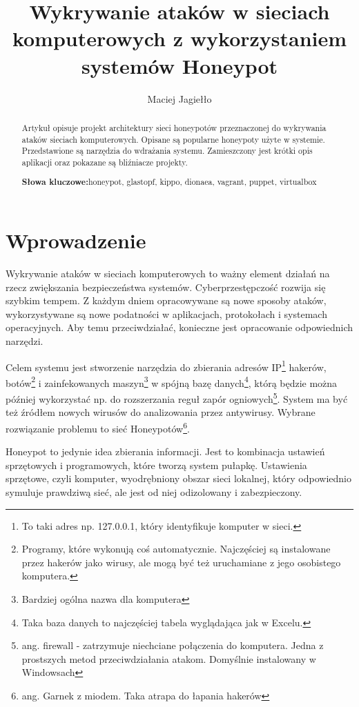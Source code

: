 \documentclass[runningheads,a4paper]{llncs}
\newcommand{\keywords}[1]{\par\addvspace\baselineskip
\noindent\keywordname\enspace\ignorespaces#1}
\renewcommand{\keywordname}{\textbf{Słowa kluczowe:}}
\begin{document}
\mainmatter
\title{Wykrywanie ataków w sieciach komputerowych z wykorzystaniem systemów Honeypot}
\author{Maciej Jagiełło}

\titlerunning{ }
\authorrunning{ }
\institute{}
\maketitle

\begin{abstract}
Artykuł opisuje projekt architektury sieci honeypotów przeznaczonej do wykrywania ataków sieciach komputerowych. Opisane są popularne honeypoty użyte w systemie. Przedstawione są narzędzia do wdrażania systemu. Zamieszczony jest krótki opis aplikacji oraz pokazane są bliźniacze projekty.
\keywords{honeypot, glastopf, kippo, dionaea, vagrant, puppet, virtualbox}
\end{abstract}


\section{Wprowadzenie}

Wykrywanie ataków w sieciach komputerowych to ważny element działań na rzecz zwiększania bezpieczeństwa systemów. Cyberprzestępczość rozwija się szybkim tempem. Z każdym dniem opracowywane są nowe sposoby ataków, wykorzystywane są nowe podatności w aplikacjach, protokołach i systemach operacyjnych. Aby temu przeciwdziałać, konieczne jest opracowanie odpowiednich narzędzi.

Celem systemu jest stworzenie narzędzia do zbierania adresów IP\footnote{To taki adres np. 127.0.0.1, który identyfikuje komputer w sieci.} hakerów, botów\footnote{Programy, które wykonują coś automatycznie. Najczęściej są instalowane przez hakerów jako wirusy, ale mogą być też uruchamiane z jego osobistego komputera.} i zainfekowanych maszyn\footnote{Bardziej ogólna nazwa dla komputera} w spójną bazę danych\footnote{Taka baza danych to najczęściej tabela wyglądająca jak w Excelu.}, którą będzie można później wykorzystać np. do rozszerzania reguł zapór ogniowych\footnote{ang. firewall - zatrzymuje niechciane połączenia do komputera. Jedna z prostszych metod przeciwdziałania atakom. Domyślnie instalowany w Windowsach}. System ma być też źródłem nowych wirusów do analizowania przez antywirusy. Wybrane rozwiązanie problemu to sieć Honeypotów\footnote{ang. Garnek z miodem. Taka atrapa do łapania hakerów}.

Honeypot to jedynie idea zbierania informacji. Jest to kombinacja ustawień sprzętowych i programowych, które tworzą system pułapkę. Ustawienia sprzętowe, czyli komputer, wyodrębniony obszar sieci lokalnej, który odpowiednio symuluje prawdziwą sieć, ale jest od niej odizolowany i zabezpieczony.
\end{document}
